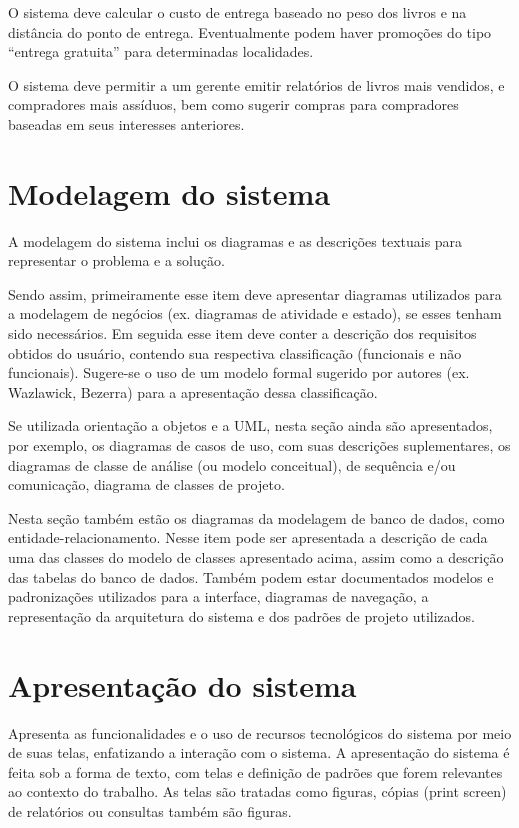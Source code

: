 O sistema deve calcular o custo de entrega baseado no peso dos livros e na distância do ponto de entrega. Eventualmente podem haver promoções do tipo “entrega gratuita” para determinadas localidades.

O sistema deve permitir a um gerente emitir relatórios de livros mais vendidos, e compradores mais assíduos, bem como sugerir compras para compradores baseadas em seus interesses anteriores.

\section{Modelagem do sistema}\label{sec:modelagemSistema}

A modelagem do sistema inclui os diagramas e as descrições textuais para representar o problema e a solução.

Sendo assim, primeiramente esse item deve apresentar diagramas utilizados para a modelagem de negócios (ex. diagramas de atividade e estado), se esses tenham sido necessários.
Em seguida esse item deve conter a descrição dos requisitos obtidos do usuário, contendo sua respectiva classificação (funcionais e não funcionais). Sugere-se o uso de um modelo formal sugerido por autores (ex. Wazlawick, Bezerra) para a apresentação dessa classificação.

Se utilizada orientação a objetos e a UML, nesta seção ainda são apresentados, por exemplo, os diagramas de casos de uso, com suas descrições suplementares, os diagramas de classe de análise (ou modelo conceitual), de sequência e/ou comunicação, diagrama de classes de projeto.

Nesta seção também estão os diagramas da modelagem de banco de dados, como entidade-relacionamento. Nesse item pode ser apresentada a descrição de cada uma das classes do modelo de classes apresentado acima, assim como a descrição das tabelas do banco de dados. Também podem estar documentados modelos e padronizações utilizados para a interface, diagramas de navegação, a representação da arquitetura do sistema e dos padrões de projeto utilizados.

\section{Apresentação do sistema}\label{sec:apresentacaoSistema}

Apresenta as funcionalidades e o uso de recursos tecnológicos do sistema por meio de suas telas, enfatizando a interação com o sistema. A apresentação do sistema é feita sob a forma de texto, com telas e definição de padrões que forem relevantes ao contexto do trabalho. As telas são tratadas como figuras, cópias (print screen) de relatórios ou consultas também são figuras.

